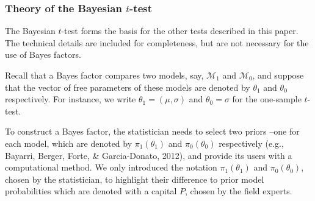 \documentclass[english,,doc,floatsintext]{apa6}
\begin{document}
\hypertarget{theory-of-the-bayesian-t-test}{%
\subsubsection{\texorpdfstring{Theory of the Bayesian \(t\)-test}{Theory of the Bayesian t-test}}\label{theory-of-the-bayesian-t-test}}

The Bayesian \(t\)-test forms the basis for the other tests described in this paper. The technical details are included for completeness, but are not necessary for the use of Bayes factors.

Recall that a Bayes factor compares two models, say, \(\mathcal{M}_{1}\) and \(\mathcal{M}_{0}\), and suppose that the vector of free parameters of these models are denoted by \(\theta_{1}\) and \(\theta_{0}\) respectively. For instance, we write \(\theta_{1} = ( \mu, \sigma)\) and \(\theta_{0} = \sigma\) for the one-sample \(t\)-test.

To construct a Bayes factor, the statistician needs to select two priors --one for each model, which are denoted by \(\pi_{1} (\theta_{1})\) and \(\pi_{0} (\theta_{0})\) respectively (e.g., Bayarri, Berger, Forte, \& Garcia-Donato, 2012), and provide its users with a computational method. We only introduced the notation \(\pi_{1} (\theta_{1})\) and \(\pi_{0} (\theta_{0})\), chosen by the statistician, to highlight their difference to prior model probabilities which are denoted with a capital \(P\), chosen by the field experts.
\end{document}
